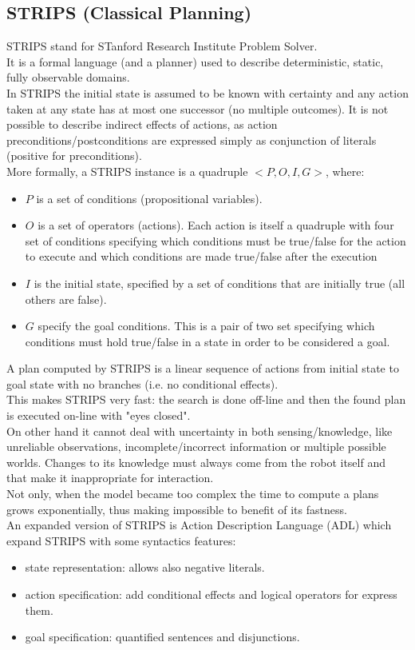 \documentclass[pdftex,12pt,a4paper]{report}
\begin{document}
\subsection{STRIPS (Classical Planning)}
\noindent STRIPS \cite{fikes1971strips} stand for STanford Research Institute Problem Solver. %
\\\noindent It is a formal language (and a planner) used to describe deterministic, static, fully observable domains. 
\\\noindent In STRIPS the initial state is assumed to be known with certainty and any action taken at any state has at most one successor (no multiple outcomes). It is not possible to describe indirect effects of actions, as action preconditions/postconditions are expressed simply as conjunction of literals (positive for preconditions).
\\\noindent More formally, a STRIPS instance is a quadruple $<P,O,I,G>$, where:
\begin{itemize}
\item $P$ is a set of conditions (propositional variables).
\item $O$ is a set of operators (actions). Each action is itself a quadruple with four set of conditions specifying which conditions must be true/false for the action to execute and which conditions are made true/false after the execution
\item $I$ is the initial state, specified by a set of conditions that are initially true (all others are false).
\item $G$ specify the goal conditions. This is a pair of two set specifying which conditions must hold true/false in a state in order to be considered a goal.
\end{itemize}
\noindent A plan computed by STRIPS is a linear sequence of actions from initial state to goal state with no branches (i.e. no conditional effects).
\\\noindent This makes STRIPS very fast: the search is done off-line and then the found plan is executed on-line with "eyes closed". 
\\\noindent On other hand it cannot deal with uncertainty in both sensing/knowledge, like unreliable observations, incomplete/incorrect information or multiple possible worlds. Changes to its knowledge must always come from the robot itself and that make it inappropriate for interaction.\\
Not only, when the model became too complex the time to compute a plans grows exponentially, thus making impossible to benefit  of its fastness.
\\\noindent An expanded version of STRIPS is Action Description Language (ADL)\cite{pednault1987formulating}%
which expand STRIPS with some syntactics features:
\begin{itemize}
\item state representation: allows also negative literals.
\item action specification: add conditional effects and logical operators for express them.
\item goal specification: quantified sentences and disjunctions.
\end{itemize}
\end{document}

